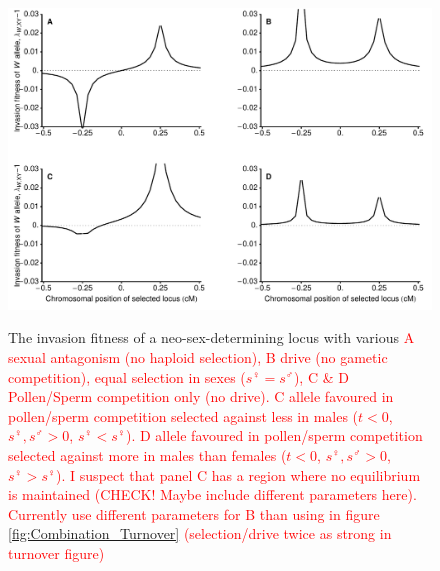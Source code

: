 \documentclass[12pt]{article}
\begin{document}
\begin{figure}[!h]
\centering
\includegraphics[width=\linewidth]{Combination_Centimorgan}\\
\caption{
The invasion fitness of a neo-sex-determining locus with various 
\textcolor{red}{A sexual antagonism (no haploid selection), B drive (no gametic competition), equal selection in sexes ($s^\female=s^\male$), C \& D Pollen/Sperm competition only (no drive). C allele favoured in pollen/sperm competition selected against less in males ($t<0$, $s^\female, s^\male >0$, $s^\female<s^\female$). D allele favoured in pollen/sperm competition selected against more in males than females ($t<0$, $s^\female, s^\male >0$, $s^\female>s^\female$). I suspect that panel C has a region where no equilibrium is maintained (CHECK! Maybe include different parameters here). Currently use different parameters for B than using in figure \ref{fig:Combination_Turnover} (selection/drive twice as strong in turnover figure)}
}
\label{fig:Combination_Centimorgans}
\end{figure}
\newpage


\end{document}
